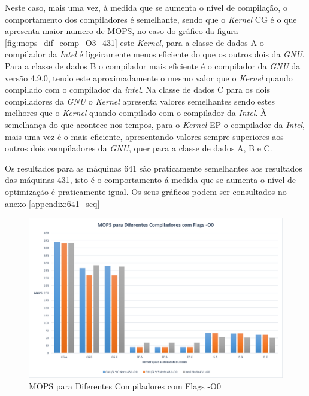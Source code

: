 \documentclass[conference,compsoc]{IEEEtran}
\begin{document}
Neste caso, mais uma vez, à medida que se aumenta o nível de compilação, o comportamento dos compiladores é semelhante, sendo que o \textit{Kernel} CG é o que apresenta maior numero de MOPS, no caso do gráfico da figura \ref{fig:mops_dif_comp_O3_431} este \textit{Kernel}, para a classe de dados A o compilador da \textit{Intel} é ligeiramente menos eficiente do que os outros dois da \textit{GNU}. Para a classe de dados B o compilador mais eficiente é o compilador da \textit{GNU} da versão 4.9.0, tendo este aproximadamente o mesmo valor que o \textit{Kernel} quando compilado com o compilador da \textit{intel}. Na classe de dados C para os dois compiladores da \textit{GNU} o \textit{Kernel} apresenta valores semelhantes sendo estes melhores que o \textit{Kernel} quando compilado com o compilador da \textit{Intel}. À semelhança do que acontece nos tempos, para o \textit{Kernel} EP o compilador da \textit{Intel}, mais uma vez é o mais eficiente, apresentando valores sempre superiores aos outros dois compiladores da \textit{GNU}, quer para a classe de dados A, B e C.

Os resultados para as máquinas 641 são praticamente semelhantes aos resultados das máquinas 431, isto é o comportamento á medida que se aumenta o nível de optimização é praticamente igual. Os seus gráficos podem ser consultados no anexo \ref{appendix:641_seq}

\begin{figure}[h!]
\centering
\includegraphics[scale=0.325]{SER/mops_dif_comp_O0_nodo_431.png}
\caption{MOPS para Diferentes Compiladores com Flags -O0}
\label{fig:mops_dif_comp_O0_431}
\end{figure}
\end{document}
